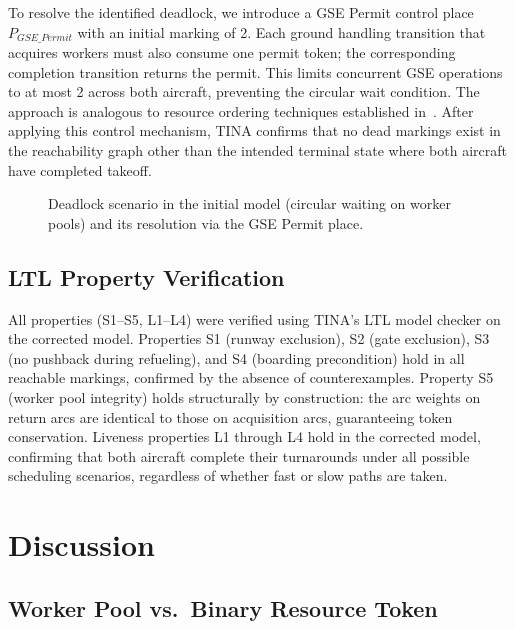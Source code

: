 \documentclass[conference]{IEEEtran}
\begin{document}
To resolve the identified deadlock, we introduce a GSE Permit control place
$P_{\mathit{GSE\_Permit}}$ with an initial marking of 2. Each ground handling
transition that acquires workers must also consume one permit token; the
corresponding completion transition returns the permit. This limits concurrent
GSE operations to at most 2 across both aircraft, preventing the circular wait
condition. The approach is analogous to resource ordering techniques established
in~\cite{b13,b16}. After applying this control mechanism, TINA confirms that no
dead markings exist in the reachability graph other than the intended terminal
state where both aircraft have completed takeoff.

\begin{figure}[htbp]
  \centering
  \caption{Deadlock scenario in the initial model (circular waiting on worker
           pools) and its resolution via the GSE Permit place.}
  \label{fig:deadlock}
\end{figure}

\subsection{LTL Property Verification}

All properties (S1--S5, L1--L4) were verified using TINA's LTL model checker on
the corrected model. Properties S1 (runway exclusion), S2 (gate exclusion), S3
(no pushback during refueling), and S4 (boarding precondition) hold in all
reachable markings, confirmed by the absence of counterexamples. Property S5
(worker pool integrity) holds structurally by construction: the arc weights on
return arcs are identical to those on acquisition arcs, guaranteeing token
conservation. Liveness properties L1 through L4 hold in the corrected model,
confirming that both aircraft complete their turnarounds under all possible
scheduling scenarios, regardless of whether fast or slow paths are taken.


\section{Discussion}

\subsection{Worker Pool vs.\ Binary Resource Token}
\end{document}

